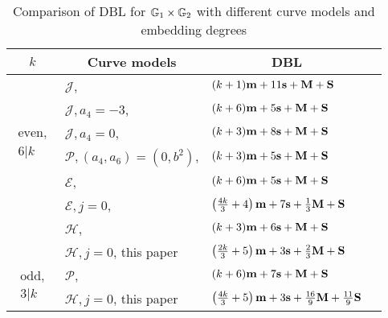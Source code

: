 \begin{table}[h]
\centering
\caption{Comparison of DBL for $\mathbb{G}_{1} \times \mathbb{G}_{2}$ with different curve models and embedding degrees}

\begin{tabular}{| l | l | l | l}
\hline
\multicolumn{1}{|c|}{$k$}
&\multicolumn{1}{|c|}{Curve models}	&\multicolumn{1}{c|}{DBL}		\\
\hline
\multicolumn{1}{|c|}{\multirow{6}{*}{
$\begin{array}{c} \text{even,} \\ 6|k \end{array}$}}
&$\mathcal{J}$, \cite{2008/IonicaJoux08} \cite{2009/fastertate}
				&$(k + 1)\textbf{m} + 11\textbf{s} + \textbf{M} + \textbf{S}$		\\
&$\mathcal{J},a_4 = -3$, \cite{2009/fastertate}
				&$(k + 6)\textbf{m} + 5\textbf{s} + \textbf{M} + \textbf{S}$	\\
&$\mathcal{J},a_4 = 0$, \cite{2009/fastertate}		
				&$(k + 3)\textbf{m} + 8\textbf{s} + \textbf{M} + \textbf{S}$		\\
&$\mathcal{P},(a_4,a_6) = (0, b^2)$, \cite{2009/craig}
				&$(k + 3)\textbf{m} + 5\textbf{s} + \textbf{M} + \textbf{S}$		\\
&$\mathcal{E}$, \cite{2009/fastertate}			
				&$(k + 6)\textbf{m} + 5\textbf{s} + \textbf{M} + \textbf{S}$			\\
&$\mathcal{E},j=0$, \cite{2014/LWZ}
				&$\left(\frac{4k}{3}+ 4\right)\textbf{m} + 7\textbf{s}  + \frac{1}{3}\textbf{M} + \textbf{S}$\\
&$\mathcal{H}$, \cite{2010/Gu}	&$(k + 3)\textbf{m} + 6\textbf{s} + \textbf{M} + \textbf{S}$ 	\\
&$\mathcal{H},j=0$, this paper 	&
$ \left(\frac{2k}{3} + 5\right)\textbf{m} + 3\textbf{s} + \frac{2}{3}\textbf{M} + \textbf{S}$			\\
\hline
\multicolumn{1}{|c|}{\multirow{2}{*}{
$\begin{array}{c} \text{odd,} \\ 3|k \end{array}$}}
&$\mathcal{P}$, \cite{2010/CLN}	&$(k + 6)\textbf{m} + 7\textbf{s} + \textbf{M} + \textbf{S}$		\\
&$\mathcal{H},j=0$, this paper
&$ \left(\frac{4k}{3} + 5\right)\textbf{m} + 3\textbf{s} + \frac{16}{9}\textbf{M} + \frac{11}{9}\textbf{S}$
\\
\hline
\end{tabular}
\label{tbl-cmp1}


\end{table}

